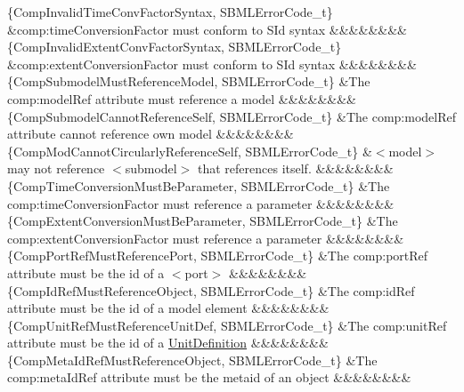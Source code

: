 \begin{DoxyParagraph}{}
\begin{longtabu}
\{Comp\+Invalid\+Time\+Conv\+Factor\+Syntax, S\+B\+M\+L\+Error\+Code\+\_\+t\} &\textquotesingle{}comp\+:time\+Conversion\+Factor\textquotesingle{} must conform to S\+Id syntax &&&&&&&&\\
\{Comp\+Invalid\+Extent\+Conv\+Factor\+Syntax, S\+B\+M\+L\+Error\+Code\+\_\+t\} &\textquotesingle{}comp\+:extent\+Conversion\+Factor\textquotesingle{} must conform to S\+Id syntax &&&&&&&&\\
\{Comp\+Submodel\+Must\+Reference\+Model, S\+B\+M\+L\+Error\+Code\+\_\+t\} &The \textquotesingle{}comp\+:model\+Ref\textquotesingle{} attribute must reference a model &&&&&&&&\\
\{Comp\+Submodel\+Cannot\+Reference\+Self, S\+B\+M\+L\+Error\+Code\+\_\+t\} &The \textquotesingle{}comp\+:model\+Ref\textquotesingle{} attribute cannot reference own model &&&&&&&&\\
\{Comp\+Mod\+Cannot\+Circularly\+Reference\+Self, S\+B\+M\+L\+Error\+Code\+\_\+t\} &{\ttfamily $<$model$>$} may not reference {\ttfamily $<$submodel$>$} that references itself. &&&&&&&&\\
\{Comp\+Time\+Conversion\+Must\+Be\+Parameter, S\+B\+M\+L\+Error\+Code\+\_\+t\} &The \textquotesingle{}comp\+:time\+Conversion\+Factor\textquotesingle{} must reference a parameter &&&&&&&&\\
\{Comp\+Extent\+Conversion\+Must\+Be\+Parameter, S\+B\+M\+L\+Error\+Code\+\_\+t\} &The \textquotesingle{}comp\+:extent\+Conversion\+Factor\textquotesingle{} must reference a parameter &&&&&&&&\\
\{Comp\+Port\+Ref\+Must\+Reference\+Port, S\+B\+M\+L\+Error\+Code\+\_\+t\} &The \textquotesingle{}comp\+:port\+Ref\textquotesingle{} attribute must be the \textquotesingle{}id\textquotesingle{} of a {\ttfamily $<$port$>$} &&&&&&&&\\
\{Comp\+Id\+Ref\+Must\+Reference\+Object, S\+B\+M\+L\+Error\+Code\+\_\+t\} &The \textquotesingle{}comp\+:id\+Ref\textquotesingle{} attribute must be the \textquotesingle{}id\textquotesingle{} of a model element &&&&&&&&\\
\{Comp\+Unit\+Ref\+Must\+Reference\+Unit\+Def, S\+B\+M\+L\+Error\+Code\+\_\+t\} &The \textquotesingle{}comp\+:unit\+Ref\textquotesingle{} attribute must be the \textquotesingle{}id\textquotesingle{} of a \hyperlink{class_unit_definition}{Unit\+Definition} &&&&&&&&\\
\{Comp\+Meta\+Id\+Ref\+Must\+Reference\+Object, S\+B\+M\+L\+Error\+Code\+\_\+t\} &The \textquotesingle{}comp\+:meta\+Id\+Ref\textquotesingle{} attribute must be the \textquotesingle{}metaid\textquotesingle{} of an object &&&&&&&&\\

\end{longtabu}
\end{DoxyParagraph}
